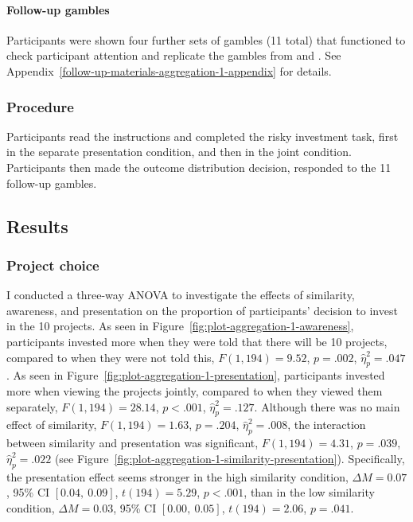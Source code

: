 \documentclass[a4paper, nobind, dvipsnames]{templates/ociamthesis}
\theoremstyle{definition}
\theoremstyle{definition}
\theoremstyle{definition}
\theoremstyle{definition}
\theoremstyle{remark}
\begin{document}
\paragraph{Follow-up gambles}

Participants were shown four further sets of gambles (11 total) that functioned
to check participant attention and replicate the gambles from \textcite{samuelson1963} and
\textcite{redelmeier1992}. See Appendix~\ref{follow-up-materials-aggregation-1-appendix}
for details.

\subsubsection{Procedure}

Participants read the instructions and completed the risky investment task,
first in the separate presentation condition, and then in the joint condition.
Participants then made the outcome distribution decision, responded to the 11
follow-up gambles.

\hypertarget{results-aggregation-1}{%
\subsection{Results}\label{results-aggregation-1}}

\subsubsection{Project choice}

I conducted a three-way ANOVA to investigate the effects of similarity,
awareness, and presentation on the proportion of participants' decision to
invest in the 10 projects. As seen in
Figure~\ref{fig:plot-aggregation-1-awareness}, participants invested more when
they were told that there will be 10 projects, compared to when they were not
told this, \(F(1, 194) = 9.52\), \(p = .002\), \(\hat{\eta}^2_p = .047\). As seen in
Figure~\ref{fig:plot-aggregation-1-presentation}, participants invested more
when viewing the projects jointly, compared to when they viewed them separately,
\(F(1, 194) = 28.14\), \(p < .001\), \(\hat{\eta}^2_p = .127\). Although there was no main effect of
similarity, \(F(1, 194) = 1.63\), \(p = .204\), \(\hat{\eta}^2_p = .008\), the interaction between
similarity and presentation was significant,
\(F(1, 194) = 4.31\), \(p = .039\), \(\hat{\eta}^2_p = .022\) (see
Figure~\ref{fig:plot-aggregation-1-similarity-presentation}). Specifically, the
presentation effect seems stronger in the high similarity condition,
\(\Delta M = 0.07\), 95\% CI \([0.04,~0.09]\), \(t(194) = 5.29\), \(p < .001\), than in the low similarity
condition, \(\Delta M = 0.03\), 95\% CI \([0.00,~0.05]\), \(t(194) = 2.06\), \(p = .041\).
\end{document}
